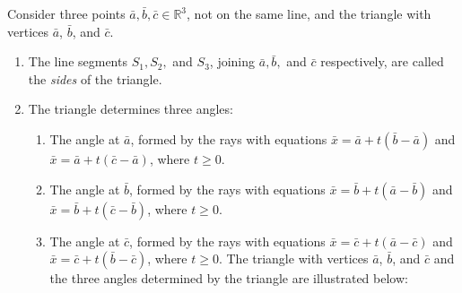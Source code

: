 \begin{remarkbox}
    Consider three points \(\bar{a}, \bar{b}, \bar{c} \in \mathbb{R}^3\), not on the same line, and the
    triangle with vertices \(\bar{a}\), \(\bar{b}\), and \(\bar{c}\).

    \begin{enumerate}
        \item The line segments \(S_1, S_2,\) and \(S_3\), joining \(\bar{a}, \bar{b},\) and \(\bar{c}\) respectively,
        are called the \textit{sides} of the triangle.
        
        \item The triangle determines three angles:
        \begin{enumerate}[label=(\alph*)]
            \item The angle at \(\bar{a}\), formed by the rays with equations 
            \(\bar{x} = \bar{a} + t(\bar{b} - \bar{a})\) and \(\bar{x} = \bar{a} + t(\bar{c} - \bar{a})\), 
            where \(t \geq 0\).
            
            \item The angle at \(\bar{b}\), formed by the rays with equations 
            \(\bar{x} = \bar{b} + t(\bar{a} - \bar{b})\) and \(\bar{x} = \bar{b} + t(\bar{c} - \bar{b})\), 
            where \(t \geq 0\).
            
            \item The angle at \(\bar{c}\), formed by the rays with equations 
            \(\bar{x} = \bar{c} + t(\bar{a} - \bar{c})\) and \(\bar{x} = \bar{c} + t(\bar{b} - \bar{c})\), 
            where \(t \geq 0\).
            The triangle with vertices \(\bar{a}\), \(\bar{b}\), and \(\bar{c}\) and the three angles
            determined by the triangle are illustrated below:
            \begin{center}
\begin{multicols}{3}
\end{multicols}
\end{center}
\end{enumerate}
\end{enumerate}
\end{remarkbox}

